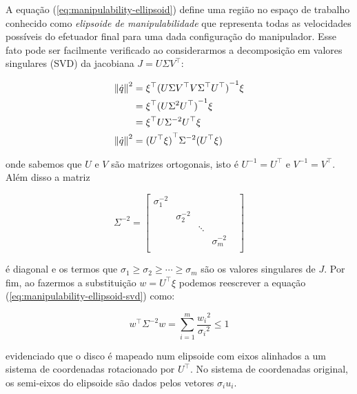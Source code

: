 A equação (\ref{eq:manipulability-ellipsoid}) define uma região no espaço de
trabalho conhecido como \emph{elipsoide de manipulabilidade} que representa
todas as velocidades possíveis do efetuador final para uma dada configuração do
manipulador. Esse fato pode ser facilmente verificado ao considerarmos a
decomposição em valores singulares (SVD) da jacobiana \(J = U \Sigma V^\top\):

\begin{align}\label{eq:manipulability-ellipsoid-svd}
    \left\Vert \dot{q} \right\Vert^2 & = \xi^\top {(U \Sigma V^\top V \Sigma^\top U^\top)}^{-1} \xi \notag \\
                                     & = \xi^\top {(U \Sigma^2 U^\top)}^{-1} \xi \notag                    \\
                                     & = \xi^\top U \Sigma^{-2} U^\top \xi \notag                          \\
    \left\Vert \dot{q} \right\Vert^2 & = {(U^\top \xi)}^\top \Sigma^{-2} (U^\top \xi)
\end{align}

onde sabemos que \(U\) e \(V\) são matrizes ortogonais, isto é \(U^{-1} =
U^\top\) e \(V^{-1} = V^\top\). Além disso a matriz

\begin{equation}
    \Sigma^{-2} = \begin{bmatrix}
        \sigma_1^{-2} &               &        &               & \\
                      & \sigma_2^{-2} &        &               & \\
                      &               & \ddots &               & \\
                      &               &        & \sigma_m^{-2} & \\
    \end{bmatrix}
\end{equation}

é diagonal e os termos que \(\sigma_1 \geq \sigma_2 \geq \cdots \geq \sigma_m\) são os valores
singulares de \(J\). Por fim, ao fazermos a substituição \(w = U^\top \xi\) podemos reescrever a equação
(\ref{eq:manipulability-ellipsoid-svd}) como:

\begin{equation}
    w^\top \Sigma^{-2} w = \sum_{i=1}^m{\frac{{w_i}^2}{{\sigma_i}^2}} \leq 1
\end{equation}

evidenciado que o disco é mapeado num elipsoide com eixos alinhados a um
sistema de coordenadas rotacionado por \(U^\top\). No sistema de coordenadas
original, os semi-eixos do elipsoide são dados pelos vetores \(\sigma_i u_i\).

